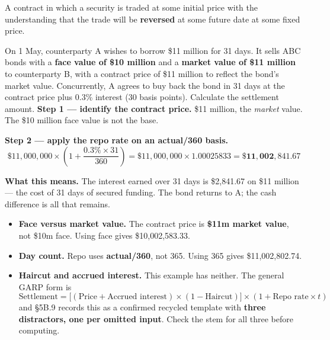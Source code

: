 \begin{lrdefbox}
A contract in which a security is traded at some initial price with the understanding that the trade will be \textbf{reversed} at some future date at some fixed price.
\end{lrdefbox}

\begin{lrexbox}
On 1 May, counterparty A wishes to borrow \$11 million for 31 days. It sells ABC bonds with a \textbf{face value of \$10 million} and a \textbf{market value of \$11 million} to counterparty B, with a contract price of \$11 million to reflect the bond's market value. Concurrently, A agrees to buy back the bond in 31 days at the contract price plus 0.3\% interest (30 basis points). Calculate the settlement amount.
\tcblower
\textbf{Step 1 --- identify the contract price.} \$11 million, the \emph{market} value. The \$10 million face value is not the base.

\textbf{Step 2 --- apply the repo rate on an actual/360 basis.}
\[ \$11{,}000{,}000 \times \left(1 + \frac{0.3\% \times 31}{360}\right) = \$11{,}000{,}000 \times 1.00025833 = \mathbf{\$11{,}002{,}841.67} \]

\textbf{What this means.} The interest earned over 31 days is \$2,841.67 on \$11 million --- the cost of 31 days of secured funding. The bond returns to A; the cash difference is all that remains.
\end{lrexbox}

\begin{lrtrapbox}
\begin{itemize}
\item \textbf{Face versus market value.} The contract price is \textbf{\$11m market value}, not \$10m face. Using face gives \$10,002,583.33.
\item \textbf{Day count.} Repo uses \textbf{actual/360}, not 365. Using 365 gives \$11,002,802.74.
\item \textbf{Haircut and accrued interest.} This example has neither. The general GARP form is \[\text{Settlement} = \bigl[(\text{Price} + \text{Accrued interest}) \times (1 - \text{Haircut})\bigr] \times (1 + \text{Repo rate} \times t)\] and \S5B.9 records this as a confirmed recycled template with \textbf{three distractors, one per omitted input}. Check the stem for all three before computing.
\end{itemize}
\end{lrtrapbox}

